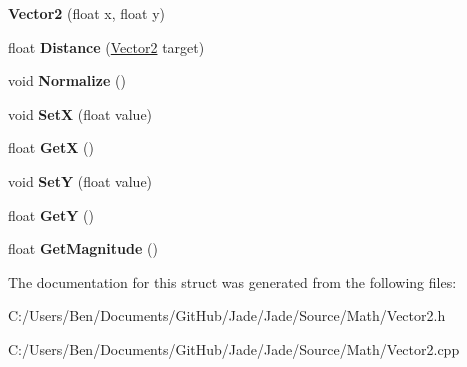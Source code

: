 \begin{DoxyCompactItemize}
\item 
\hypertarget{struct_jade_1_1_math_1_1_vector2_ab320239a30e8576e6a644ddfb269b40f}{}{\bfseries Vector2} (float x, float y)\label{struct_jade_1_1_math_1_1_vector2_ab320239a30e8576e6a644ddfb269b40f}

\item 
\hypertarget{struct_jade_1_1_math_1_1_vector2_ac196020f2a95b05cd511dfab3e0385ba}{}float {\bfseries Distance} (\hyperlink{struct_jade_1_1_math_1_1_vector2}{Vector2} target)\label{struct_jade_1_1_math_1_1_vector2_ac196020f2a95b05cd511dfab3e0385ba}

\item 
\hypertarget{struct_jade_1_1_math_1_1_vector2_a42da30ca3cd936c99f3e31fbca4b78c9}{}void {\bfseries Normalize} ()\label{struct_jade_1_1_math_1_1_vector2_a42da30ca3cd936c99f3e31fbca4b78c9}

\item 
\hypertarget{struct_jade_1_1_math_1_1_vector2_aaa667fa6a5c96f0b79f5ff92ebcf9bb3}{}void {\bfseries Set\+X} (float value)\label{struct_jade_1_1_math_1_1_vector2_aaa667fa6a5c96f0b79f5ff92ebcf9bb3}

\item 
\hypertarget{struct_jade_1_1_math_1_1_vector2_af3477eef05d8a5ab76df71e606d69d7e}{}float {\bfseries Get\+X} ()\label{struct_jade_1_1_math_1_1_vector2_af3477eef05d8a5ab76df71e606d69d7e}

\item 
\hypertarget{struct_jade_1_1_math_1_1_vector2_a231bbb73a9c6a92d939fd354e5e0565e}{}void {\bfseries Set\+Y} (float value)\label{struct_jade_1_1_math_1_1_vector2_a231bbb73a9c6a92d939fd354e5e0565e}

\item 
\hypertarget{struct_jade_1_1_math_1_1_vector2_aede9d32a44af45b2302b8a13bb6bf1e2}{}float {\bfseries Get\+Y} ()\label{struct_jade_1_1_math_1_1_vector2_aede9d32a44af45b2302b8a13bb6bf1e2}

\item 
\hypertarget{struct_jade_1_1_math_1_1_vector2_a7708742d949d6861894ecdcad9c880ab}{}float {\bfseries Get\+Magnitude} ()\label{struct_jade_1_1_math_1_1_vector2_a7708742d949d6861894ecdcad9c880ab}

\end{DoxyCompactItemize}


The documentation for this struct was generated from the following files\+:\begin{DoxyCompactItemize}
\item 
C\+:/\+Users/\+Ben/\+Documents/\+Git\+Hub/\+Jade/\+Jade/\+Source/\+Math/Vector2.\+h\item 
C\+:/\+Users/\+Ben/\+Documents/\+Git\+Hub/\+Jade/\+Jade/\+Source/\+Math/Vector2.\+cpp\end{DoxyCompactItemize}
